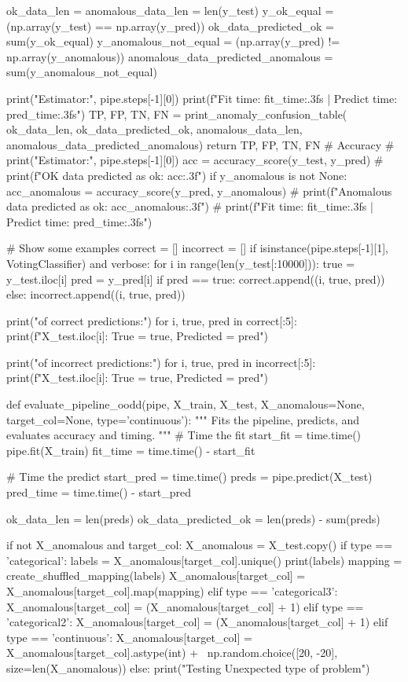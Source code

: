 {{    ok_data_len = anomalous_data_len = len(y_test)
    y_ok_equal = (np.array(y_test) == np.array(y_pred))
    ok_data_predicted_ok = sum(y_ok_equal)
    y_anomalous_not_equal = (np.array(y_pred) != np.array(y_anomalous))
    anomalous_data_predicted_anomalous = sum(y_anomalous_not_equal)

    print("Estimator:", pipe.steps[-1][0])
    print(f"Fit time: {fit_time:.3f}s | Predict time: {pred_time:.3f}s")
    TP, FP, TN, FN = print_anomaly_confusion_table(
        ok_data_len, ok_data_predicted_ok, anomalous_data_len, anomalous_data_predicted_anomalous)
    return TP, FP, TN, FN
    # Accuracy
    # print("Estimator:", pipe.steps[-1][0])
    acc = accuracy_score(y_test, y_pred)
    # print(f"OK data predicted as ok: {acc:.3f}")
    if y_anomalous is not None:
        acc_anomalous = accuracy_score(y_pred, y_anomalous)
    #     print(f"Anomalous data predicted as ok: {acc_anomalous:.3f}")
    # print(f"Fit time: {fit_time:.3f}s | Predict time: {pred_time:.3f}s")

    # Show some examples
    correct = []
    incorrect = []
    if isinstance(pipe.steps[-1][1], VotingClassifier) and verbose:
        for i in range(len(y_test[:10000])):
            true = y_test.iloc[i]
            pred = y_pred[i]
            if pred == true:
                correct.append((i, true, pred))
            else:
                incorrect.append((i, true, pred))

        print("\nExamples of correct predictions:")
        for i, true, pred in correct[:5]:
            print(f"{X_test.iloc[i]}: True = {true}, Predicted = {pred}")

        print("\nExamples of incorrect predictions:")
        for i, true, pred in incorrect[:5]:
            print(f"{X_test.iloc[i]}: True = {true}, Predicted = {pred}")


def evaluate_pipeline_oodd(pipe, X_train, X_test, X_anomalous=None, target_col=None, type='continuous'):
    """
    Fits the pipeline, predicts, and evaluates accuracy and timing.
    """
    # Time the fit
    start_fit = time.time()
    pipe.fit(X_train)
    fit_time = time.time() - start_fit

    # Time the predict
    start_pred = time.time()
    preds = pipe.predict(X_test)
    pred_time = time.time() - start_pred

    ok_data_len = len(preds)
    ok_data_predicted_ok = len(preds) - sum(preds)

    if not X_anomalous and target_col:
        X_anomalous = X_test.copy()
        if type == 'categorical':
            labels = X_anomalous[target_col].unique()
            print(labels)
            mapping = create_shuffled_mapping(labels)
            X_anomalous[target_col] = X_anomalous[target_col].map(mapping)
        elif type == 'categorical3':
            X_anomalous[target_col] = (X_anomalous[target_col] + 1) %
        elif type == 'categorical2':
            X_anomalous[target_col] = (X_anomalous[target_col] + 1) %
        elif type == 'continuous':
            X_anomalous[target_col] = X_anomalous[target_col].astype(int) + \
                np.random.choice([20, -20], size=len(X_anomalous))
        else:
            print("Testing Unexpected type of problem")

}}
